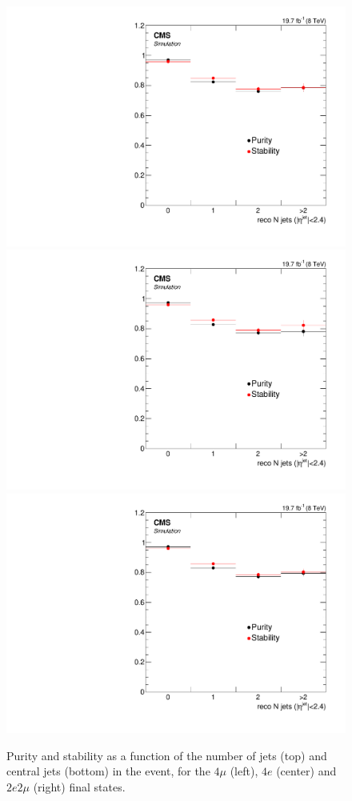 \begin{figure}[hbtp]
\begin{center}
    \includegraphics[width=0.8\cmsFigWidth]{Figures/Unfolding/BinMigration/PurityStability_4m_CentralJets_Mad}
    \includegraphics[width=0.8\cmsFigWidth]{Figures/Unfolding/BinMigration/PurityStability_4e_CentralJets_Mad}
    \includegraphics[width=0.8\cmsFigWidth]{Figures/Unfolding/BinMigration/PurityStability_2e2m_CentralJets_Mad}
 \caption{Purity and stability as a function of the number of jets (top) and central jets (bottom) in the event,  for the $4\mu$ (left), $4e$ (center) and $2e2\mu$ (right) final states.}
    \label{fig:ps_jets}
  \end{center}
\end{figure}

